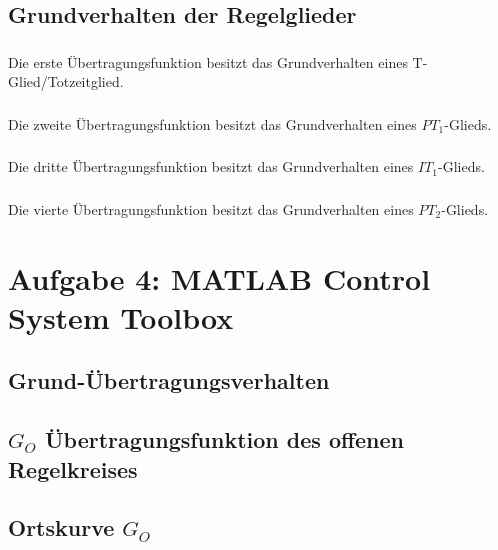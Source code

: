 \documentclass{article}
\begin{document}
		\subsection{Grundverhalten der Regelglieder}		
			\subsubsection{}
				Die erste Übertragungsfunktion besitzt das Grundverhalten eines T-Glied/Totzeitglied.
			\subsubsection{}
				Die zweite Übertragungsfunktion besitzt das Grundverhalten eines $PT_1$-Glieds.
			\subsubsection{}
				Die dritte Übertragungsfunktion besitzt das Grundverhalten eines $IT_1$-Glieds.
			\subsubsection{}
				Die vierte Übertragungsfunktion besitzt das Grundverhalten eines $PT_2$-Glieds. 
				
	\section{Aufgabe 4: MATLAB Control System Toolbox}
		\subsection{Grund-Übertragungsverhalten}
		\subsection{$G_O$ Übertragungsfunktion des offenen Regelkreises}
		\subsection{Ortskurve $G_O$}
	
\end{document}
